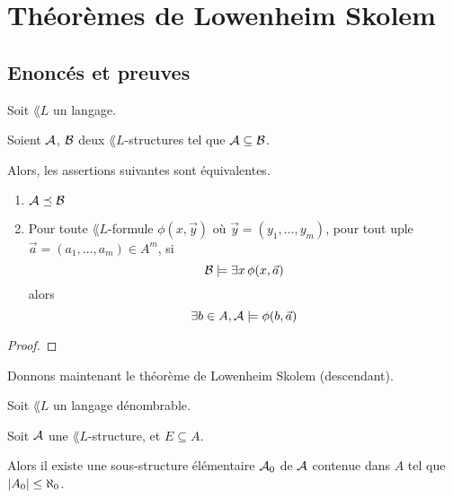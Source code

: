 \documentclass[a4paper, 12pt]{report}
\begin{document}
\chapter{Théorèmes de Lowenheim Skolem}

\section{Enoncés et preuves}

\begin{theorem} 
	\label{theorem:tarski_vaught}
	Soit $\lang{L}$ un langage.

	Soient $\mathcal{A}$, $\mathcal{B}$ deux $\lang{L}$-structures tel que
	$\mathcal{A} \subseteq \mathcal{B}$.

	Alors, les assertions suivantes sont équivalentes.

	\begin{enumerate}
		\item $\mathcal{A} \preceq \mathcal{B}$
		\item Pour toute $\lang{L}$-formule $\phi(x, \vec{y})$ où $\vec{y} =
			(y_{1}, \dots, y_{m}) $, pour tout uple $\vec{a} = (a_{1}, \dots,
			a_{m}) \in A^{m}$, si 
			\begin{equation}
				\mathcal{B} \models \exists x \, \phi(x, \vec{a})
			\end{equation}
			alors
			\begin{equation}
				\exists b \in A, \mathcal{A} \models \phi(b, \vec{a})
			\end{equation}
	\end{enumerate}
\end{theorem}

\ifdefined\outputproof
\begin{proof}

\end{proof}
\fi

Donnons maintenant le théorème de Lowenheim Skolem (descendant).

\begin{theorem} 
	Soit $\lang{L}$ un langage dénombrable.

	Soit $\mathcal{A}$ une $\lang{L}$-structure, et $E \subseteq A$.

	Alors il existe une sous-structure élémentaire $\mathcal{A}_{0}$ de
	$\mathcal{A}$ contenue dans $A$ tel que $|A_{0}| \leq
	\aleph_{0}$.
	\label{theorem:lowenheim_skolem_descendant}
\end{theorem}
\end{document}
